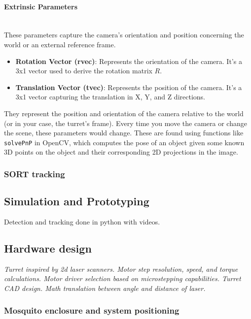 \paragraph{Extrinsic Parameters}\mbox{}\\
These parameters capture the camera's orientation and position concerning the world or an external reference frame.

\begin{itemize}
    \item \textbf{Rotation Vector (rvec)}: Represents the orientation of the camera. It's a 3x1 vector used to derive the rotation matrix \( R \).

    \item \textbf{Translation Vector (tvec)}: Represents the position of the camera. It's a 3x1 vector capturing the translation in X, Y, and Z directions.
\end{itemize}

They represent the position and orientation of the camera relative to the world (or in your case, the turret's frame). Every time you move the camera or change the scene, these parameters would change. These are found using functions like \verb|solvePnP| in OpenCV, which computes the pose of an object given some known 3D points on the object and their corresponding 2D projections in the image.

\subsubsection{SORT tracking}

\subsection{Simulation and Prototyping}
Detection and tracking done in python with videos.


\subsection{Hardware design}
\textit{Turret inspired by 2d laser scanners. Motor step resolution, speed, and torque calculations. Motor driver selection based on microstepping capabilities. Turret CAD design. Math translation between angle and distance of laser.}

\subsubsection{Mosquito enclosure and system positioning}
\newcommand{\enclosureWidthCM}{90} %
\newcommand{\enclosureHeightCM}{38} %
\newcommand{\enclosureDepthCM}{32} %

